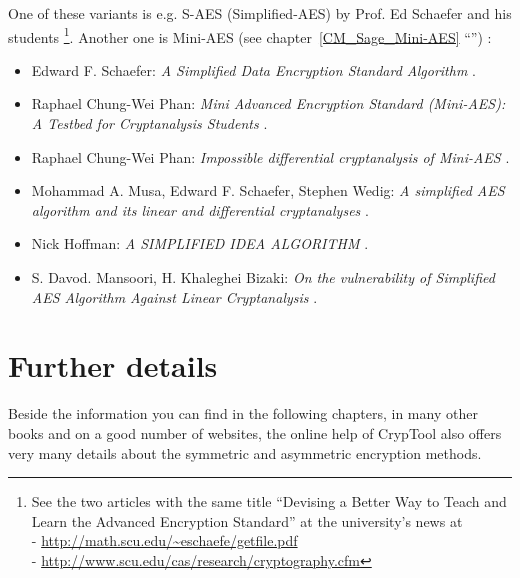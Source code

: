 One of these variants is e.g. S-AES (Simplified-AES) by Prof. Ed Schaefer
and his students \cite{cm:Musa-etal2003}%
\footnote{
    See the two articles with the same title
    ``Devising a Better Way to Teach and Learn the Advanced Encryption Standard''
    at the university's news at\\
    - \url{http://math.scu.edu/~eschaefe/getfile.pdf} \\
    - \url{http://www.scu.edu/cas/research/cryptography.cfm}
}.
Another one is Mini-AES \cite{cm:Phan2002}
(see chapter~\ref{CM_Sage_Mini-AES} ``'')%
:
\begin{itemize}

\item Edward F. Schaefer: {\em A Simplified Data Encryption Standard Algorithm} 
      \cite{cm:Schaefer1996}.

\item Raphael Chung-Wei Phan: {\em Mini Advanced Encryption Standard (Mini-AES):
                                   A Testbed for Cryptanalysis Students} 
      \cite{cm:Phan2002}.

\item Raphael Chung-Wei Phan: {\em Impossible differential cryptanalysis of Mini-AES} 
      \cite{cm:Phan2003}.

\item Mohammad A. Musa, Edward F. Schaefer, Stephen Wedig:
      {\em A simplified AES algorithm and its linear and differential cryptanalyses} 
      \cite{cm:Musa-etal2003}.

\item Nick Hoffman: {\em A SIMPLIFIED IDEA ALGORITHM} 
      \cite{cm:Hoffman2006}.

\item S. Davod. Mansoori, H. Khaleghei Bizaki: 
      {\em On the vulnerability of Simplified AES Algorithm Against Linear Cryptanalysis} 
      \cite{cm:Mansoori-etal2007}.

\end{itemize}




\section{Further details}

Beside the information you can find in the following chapters, in many other
books and on a good number of websites, the online help of 
CrypTool also offers very many details about the 
symmetric and asymmetric encryption methods.


